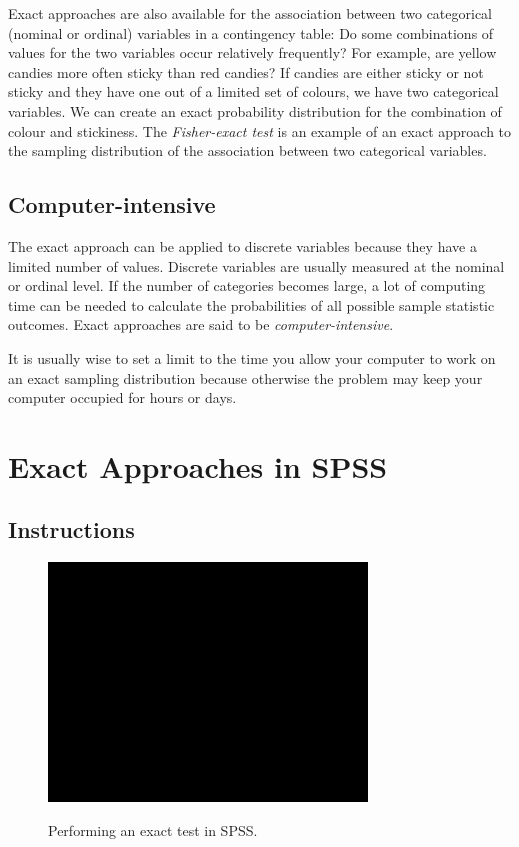 \documentclass[a4paper]{book}
\theoremstyle{definition}
\theoremstyle{definition}
\theoremstyle{definition}
\theoremstyle{remark}
\begin{document}
Exact approaches are also available for the association between two
categorical (nominal or ordinal) variables in a contingency table: Do
some combinations of values for the two variables occur relatively
frequently? For example, are yellow candies more often sticky than red
candies? If candies are either sticky or not sticky and they have one
out of a limited set of colours, we have two categorical variables. We
can create an exact probability distribution for the combination of
colour and stickiness. The \emph{Fisher-exact test} is an example of an
exact approach to the sampling distribution of the association between
two categorical variables.

\subsection{Computer-intensive}\label{computer-intensive}

The exact approach can be applied to discrete variables because they
have a limited number of values. Discrete variables are usually measured
at the nominal or ordinal level. If the number of categories becomes
large, a lot of computing time can be needed to calculate the
probabilities of all possible sample statistic outcomes. Exact
approaches are said to be \emph{computer-intensive}.

It is usually wise to set a limit to the time you allow your computer to
work on an exact sampling distribution because otherwise the problem may
keep your computer occupied for hours or days.

\section{Exact Approaches in SPSS}\label{SPSS-exact}

\subsection{Instructions}\label{instructions-1}

\begin{figure}[H]
\href{https://www.youtube.com/embed/7cZKqrlofAs}{\includegraphics[width=320px]{GentleIntro_files/figure-latex/SPSSExact1-1} }\caption{Performing an exact test in SPSS.}\label{fig:SPSSExact1}
\end{figure}
\end{document}

